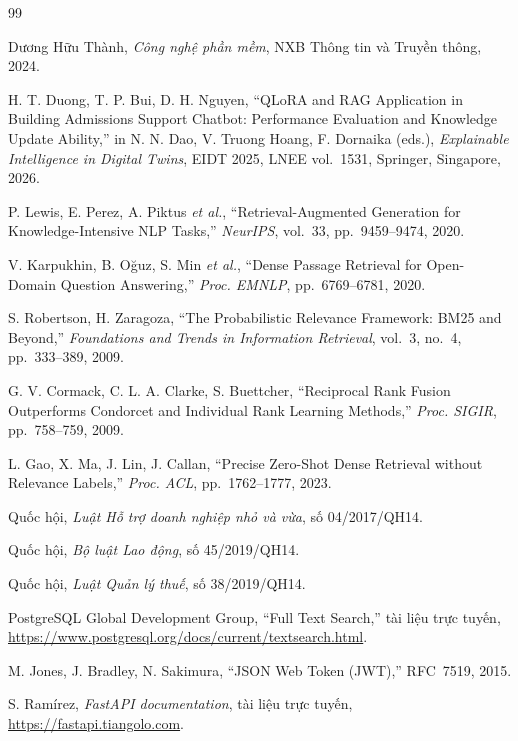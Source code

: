 \clearpage
{}
{}
\begin{thebibliography}{99}

Dương Hữu Thành, \textit{Công nghệ phần mềm}, NXB Thông tin và Truyền thông, 2024.

H. T. Duong, T. P. Bui, D. H. Nguyen, ``QLoRA and RAG Application in Building
Admissions Support Chatbot: Performance Evaluation and Knowledge Update
Ability,'' in N. N. Dao, V. Truong Hoang, F. Dornaika (eds.),
\textit{Explainable Intelligence in Digital Twins}, EIDT 2025, LNEE vol.~1531,
Springer, Singapore, 2026.

P. Lewis, E. Perez, A. Piktus \textit{et al.}, ``Retrieval-Augmented Generation
for Knowledge-Intensive NLP Tasks,'' \textit{NeurIPS}, vol.~33, pp.~9459--9474,
2020.

V. Karpukhin, B. Oğuz, S. Min \textit{et al.}, ``Dense Passage Retrieval for
Open-Domain Question Answering,'' \textit{Proc. EMNLP}, pp.~6769--6781, 2020.

S. Robertson, H. Zaragoza, ``The Probabilistic Relevance Framework: BM25 and
Beyond,'' \textit{Foundations and Trends in Information Retrieval}, vol.~3,
no.~4, pp.~333--389, 2009.

G. V. Cormack, C. L. A. Clarke, S. Buettcher, ``Reciprocal Rank Fusion
Outperforms Condorcet and Individual Rank Learning Methods,'' \textit{Proc.
SIGIR}, pp.~758--759, 2009.

L. Gao, X. Ma, J. Lin, J. Callan, ``Precise Zero-Shot Dense Retrieval without
Relevance Labels,'' \textit{Proc. ACL}, pp.~1762--1777, 2023.

Quốc hội, \textit{Luật Hỗ trợ doanh nghiệp nhỏ và vừa}, số 04/2017/QH14.

Quốc hội, \textit{Bộ luật Lao động}, số 45/2019/QH14.

Quốc hội, \textit{Luật Quản lý thuế}, số 38/2019/QH14.

PostgreSQL Global Development Group, ``Full Text Search,'' tài liệu trực tuyến,
\url{https://www.postgresql.org/docs/current/textsearch.html}.

M. Jones, J. Bradley, N. Sakimura, ``JSON Web Token (JWT),'' RFC~7519, 2015.

S. Ramírez, \textit{FastAPI documentation}, tài liệu trực tuyến,
\url{https://fastapi.tiangolo.com}.


\end{thebibliography}
